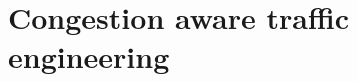 \chapter{Congestion aware traffic engineering}
\label{sec:cate}

\renewcommand{\locfolder}{\chapfolder/cate}




